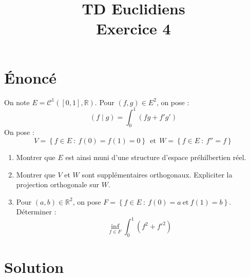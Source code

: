 \documentclass[french]{article}
\title{TD Euclidiens\\ Exercice 4}
\date{}
\newcommand{\R}{\mathbb{R}}
\begin{document}
\maketitle

\section{Énoncé}
On note $E=\mathcal{C}^1([0,1],\R)$. Pour $(f,g)\in E^2$, on pose : $$(f\mid g)=\int_{0}^{1}(fg+f'g')$$ On pose : $$V=\left\{f\in E\ : \ f(0)=f(1)=0\right\}\ \ \text{et}\ \ W=\left\{f\in E\ : \ f''=f\right\}$$
\begin{enumerate}
	\item Montrer que $E$ est ainsi muni d'une structure d'espace préhilbertien réel.
	\item Montrer que $V$ et $W$ sont supplémentaires orthogonaux. Expliciter la projection orthogonale sur $W$.
	\item Pour $(a,b)\in\R^2$, on pose $F=\left\{f\in E\ : \ f(0)=a\ \text{et}\ f(1)=b\right\}$. Déterminer : $$\underset{f\in F}{\inf}\int_{0}^{1}(f^2+f'^2)$$
\end{enumerate}

\section{Solution}
\end{document}
